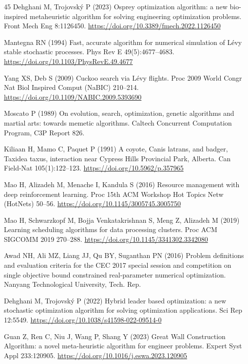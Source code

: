 \documentclass[pdflatex,onecolumn,sn-mathphys-num]{sn-jnl}
\begin{document}
\begin{thebibliography}{45}
Dehghani M, Trojovsk\'{y} P (2023) Osprey optimization algorithm: a new bio-inspired metaheuristic algorithm for solving engineering optimization problems. Front Mech Eng 8:1126450. \url{https://doi.org/10.3389/fmech.2022.1126450}

Mantegna RN (1994) Fast, accurate algorithm for numerical simulation of L\'{e}vy stable stochastic processes. Phys Rev E 49(5):4677--4683. \url{https://doi.org/10.1103/PhysRevE.49.4677}

Yang XS, Deb S (2009) Cuckoo search via L\'{e}vy flights. Proc 2009 World Congr Nat Biol Inspired Comput (NaBIC) 210--214. \url{https://doi.org/10.1109/NABIC.2009.5393690}

Moscato P (1989) On evolution, search, optimization, genetic algorithms and martial arts: towards memetic algorithms. Caltech Concurrent Computation Program, C3P Report 826.

Kiliaan H, Mamo C, Paquet P (1991) A coyote, Canis latrans, and badger, Taxidea taxus, interaction near Cypress Hills Provincial Park, Alberta. Can Field-Nat 105(1):122--123. \url{https://doi.org/10.5962/p.357965}

Mao H, Alizadeh M, Menache I, Kandula S (2016) Resource management with deep reinforcement learning. Proc 15th ACM Workshop Hot Topics Netw (HotNets) 50--56. \url{https://doi.org/10.1145/3005745.3005750}

Mao H, Schwarzkopf M, Bojja Venkatakrishnan S, Meng Z, Alizadeh M (2019) Learning scheduling algorithms for data processing clusters. Proc ACM SIGCOMM 2019 270--288. \url{https://doi.org/10.1145/3341302.3342080}

Awad NH, Ali MZ, Liang JJ, Qu BY, Suganthan PN (2016) Problem definitions and evaluation criteria for the CEC 2017 special session and competition on single objective bound constrained real-parameter numerical optimization. Nanyang Technological University, Tech. Rep.

Dehghani M, Trojovsk\'{y} P (2022) Hybrid leader based optimization: a new stochastic optimization algorithm for solving optimization applications. Sci Rep 12:5549. \url{https://doi.org/10.1038/s41598-022-09514-0}

Guan Z, Ren C, Niu J, Wang P, Shang Y (2023) Great Wall Construction Algorithm: a novel meta-heuristic algorithm for engineer problems. Expert Syst Appl 233:120905. \url{https://doi.org/10.1016/j.eswa.2023.120905}


\end{thebibliography}
\end{document}
